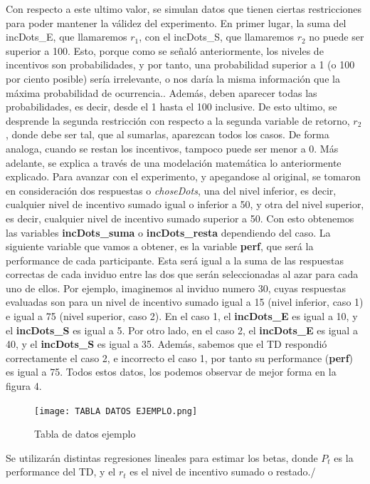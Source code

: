 \documentclass[11pt,letterpaper]{article}
\begin{document}
Con respecto a este ultimo valor, se simulan datos que tienen ciertas restricciones para poder mantener la válidez del experimento. En primer lugar, la suma del incDots\_E, que llamaremos $r_1$, con el incDots\_S, que llamaremos $r_2$ no puede ser superior a 100. Esto, porque como se señaló anteriormente, los niveles de incentivos son probabilidades, y por tanto, una probabilidad superior a 1 (o 100 por ciento posible) sería irrelevante, o nos daría la misma información que la máxima probabilidad de ocurrencia.. Además, deben aparecer todas las probabilidades, es decir, desde el 1 hasta el 100 inclusive. 
De esto ultimo, se desprende la segunda restricción con respecto a la segunda variable de retorno, $r_2$, donde debe ser tal, que al sumarlas, aparezcan todos los casos.
De forma analoga, cuando se restan los incentivos, tampoco puede ser menor a 0.
Más adelante, se explica a través de una modelación matemática lo anteriormente explicado.
Para avanzar con el experimento, y apegandose al original, se tomaron en consideración dos respuestas o \textit{choseDots}, una del nivel inferior, es decir, cualquier nivel de incentivo sumado igual o inferior a 50, y otra del nivel superior, es decir, cualquier nivel de incentivo sumado superior a 50.
Con esto obtenemos las variables \textbf{incDots\_suma} o \textbf{incDots\_resta} dependiendo del caso.
La siguiente variable que vamos a obtener, es la variable \textbf{perf}, que será la performance de cada participante. Esta será igual a la suma de las respuestas correctas de cada inviduo entre las dos que serán seleccionadas al azar para cada uno de ellos.
Por ejemplo, imaginemos al inviduo numero 30, cuyas respuestas evaluadas son para un nivel de incentivo sumado igual a 15 (nivel inferior, caso 1) e igual a 75 (nivel superior, caso 2). En el caso 1, el \textbf{incDots\_E} es igual a 10, y el \textbf{incDots\_S} es igual a 5. Por otro lado, en el caso 2, el \textbf{incDots\_E} es igual a 40, y el \textbf{incDots\_S} es igual a 35.  Además, sabemos que el TD respondió correctamente el caso 2, e incorrecto el caso 1, por tanto su performance (\textbf{perf}) es igual a 75. Todos estos datos, los podemos observar de mejor forma en la figura 4.


\begin{figure}[h]
    \centering
    \texttt{[image: TABLA DATOS EJEMPLO.png]}
    \caption{Tabla de datos ejemplo}
\end{figure}



Se utilizarán distintas regresiones lineales para estimar los betas, donde $P_t$ es la performance del TD, y el $r_t$ es el nivel de incentivo sumado o restado./
\end{document}
